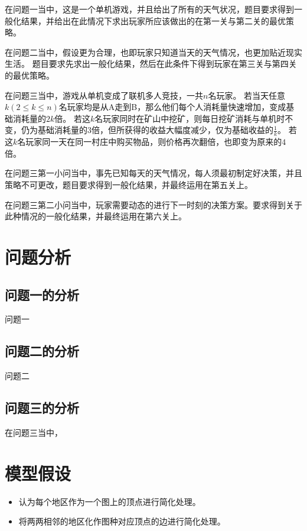 \documentclass{cumcmthesis}
\begin{document}
\par
在问题一当中，这是一个单机游戏，并且给出了所有的天气状况，题目要求得到一般化结果，并给出在此情况下求出玩家所应该做出的在第一关与第二关的最优策略。

\par
在问题二当中，假设更为合理，也即玩家只知道当天的天气情况，也更加贴近现实生活。
题目要求先求出一般化结果，然后在此条件下得到玩家在第三关与第四关的最优策略。

\par
在问题三当中，游戏从单机变成了联机多人竞技，一共$n$名玩家。
若当天任意$k (2\leq k\leq n)$名玩家均是从A走到B，那么他们每个人消耗量快速增加，变成基础消耗量的$ 2k $倍。
若这$k$名玩家同时在矿山中挖矿，则每日挖矿消耗与单机时不变，仍为基础消耗量的$ 3 $倍，但所获得的收益大幅度减少，仅为基础收益的$\frac{1}{k} $。
若这$k$名玩家同一天在同一村庄中购买物品，则价格再次翻倍，也即变为原来的$4$倍。

\par
在问题三第一小问当中，事先已知每天的天气情况，每人须最初制定好决策，并且策略不可更改，题目要求得到一般化结果，并最终运用在第五关上。

\par
在问题三第二小问当中，玩家需要动态的进行下一时刻的决策方案。要求得到关于此种情况的一般化结果，并最终运用在第六关上。

\newpage
\section{问题分析}
\subsection{问题一的分析}
问题一


\subsection{问题二的分析}
问题二

\subsection{问题三的分析}
在问题三当中，



\newpage
\section{模型假设}
\begin{itemize}
	\item 认为每个地区作为一个图上的顶点进行简化处理。
	\item 将两两相邻的地区化作图种对应顶点的边进行简化处理。
\end{itemize}
\par\par\par
\end{document}
